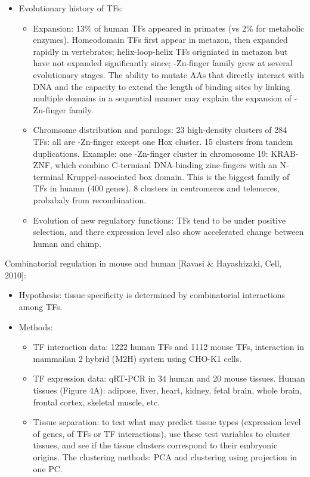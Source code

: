 \documentclass{report}
\begin{document}
\begin{enumerate}
\begin{itemize}
		\item Evolutionary history of TFs: 
		\begin{itemize}
			\item Expansion: 13\% of human TFs appeared in primates (vs 2\% for metabolic enzymes). Homeodomain TFs first appear in metazon, then expanded rapidly in vertebrates; helix-loop-helix TFs origniated in metazon but have not expanded significantly since; -Zn-finger family grew at several evolutionary stages. The ability to mutate AAs that directly interact with DNA and the capacity to extend the length of binding sites by linking multiple domains in a sequential manner may explain the expansion of -Zn-finger family. 
			\item Chromsome distribution and paralogs: 23 high-density clusters of 284 TFs: all are -Zn-finger except one Hox cluster. 15 clusters from tandem duplications. Example: one -Zn-finger cluster in chromosome 19: KRAB-ZNF, which combine C-termianl DNA-binding zinc-fingers with an N-terminal Kruppel-associated box domain. This is the biggest family of TFs in huamn (400 genes). 8 clusters in centromeres and telemeres, probabaly from recombination. 
			\item Evolution of new regulatory functions: TFs tend to be under positive selection, and there expression level also show accelerated change between human and chimp. 
		\end{itemize}
	\end{itemize}
	
	Combinatorial regulation in mouse and human [Ravasi \& Hayashizaki, Cell, 2010]:
	\begin{itemize}
		\item Hypothesis: tissue specificity is determined by combinatorial interactions among TFs. 
		
		\item Methods: 
		\begin{itemize}
			\item TF interaction data: 1222 human TFs and 1112 mouse TFs, interaction in mammailan 2 hybrid (M2H) system using CHO-K1 cells. 
			\item TF expression data: qRT-PCR in 34 human and 20 mouse tissues. Human tissues (Figure 4A): adipose, liver, heart, kidney, fetal brain, whole brain, frontal cortex, skeletal muscle, etc. 
			\item Tissue separation: to test what may predict tissue types (expression level of genes, of TFs or TF interactions), use these test variables to cluster tissues, and see if the tissue clusters correspond to their embryonic origins. The clustering methods: PCA and clustering using projection in one PC. 
		\end{itemize}
		

\end{itemize}
\end{enumerate}
\end{document}

